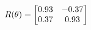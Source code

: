 \documentclass[preview]{standalone}
\begin{document}
\begin{align*}
\special{dvisvgm:raw <g id='unique000'>}R(\theta) = \begin{bmatrix}0.93 & -0.37\\0.37 & 0.93\end{bmatrix}\special{dvisvgm:raw </g>}
\end{align*}
\end{document}
